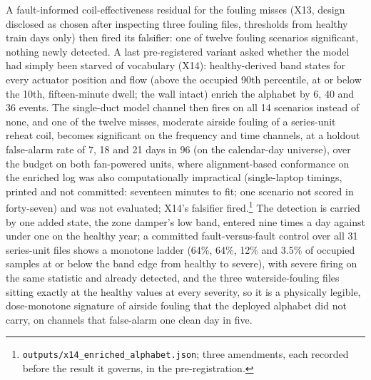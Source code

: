 \documentclass[11pt,letterpaper]{article}
\begin{document}
A fault-informed coil-effectiveness residual for the fouling misses (X13, design disclosed as chosen after inspecting three fouling files, thresholds from healthy train days only) then fired its falsifier: one of twelve fouling scenarios significant, nothing newly detected. A last pre-registered variant asked whether the model had simply been starved of vocabulary (X14): healthy-derived band states for every actuator position and flow (above the occupied 90th percentile, at or below the 10th, fifteen-minute dwell; the wall intact) enrich the alphabet by 6, 40 and 36 events. The single-duct model channel then fires on all 14 scenarios instead of none, and one of the twelve misses, moderate airside fouling of a series-unit reheat coil, becomes significant on the frequency and time channels, at a holdout false-alarm rate of 7, 18 and 21 days in 96 (on the calendar-day universe), over the budget on both fan-powered units, where alignment-based conformance on the enriched log was also computationally impractical (single-laptop timings, printed and not committed: seventeen minutes to fit; one scenario not scored in forty-seven) and was not evaluated; X14's falsifier fired.\footnote{\texttt{outputs/x14\_enriched\_alphabet.json}; three amendments, each recorded before the result it governs, in the pre-registration.} The detection is carried by one added state, the zone damper's low band, entered nine times a day against under one on the healthy year; a committed fault-versus-fault control over all 31 series-unit files shows a monotone ladder (64\%, 64\%, 12\% and 3.5\% of occupied samples at or below the band edge from healthy to severe), with severe firing on the same statistic and already detected, and the three waterside-fouling files sitting exactly at the healthy values at every severity, so it is a physically legible, dose-monotone signature of airside fouling that the deployed alphabet did not carry, on channels that false-alarm one clean day in five.
\end{document}
